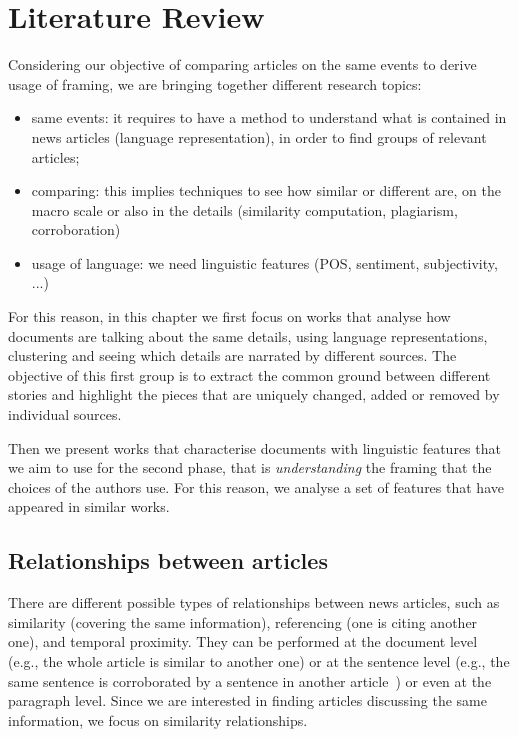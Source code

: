 \chapter{Literature Review}
\label{chap:literature_review}


Considering our objective of comparing articles on the same events to derive  usage of framing, we are bringing together different research topics:

\begin{itemize}
    \item same events: it requires to have a method to understand what is contained in news articles (language representation), in order to find groups of relevant articles;
    \item comparing: this implies techniques to see how similar or different are, on the macro scale or also in the details (similarity computation, plagiarism, corroboration)
    \item usage of language: we need linguistic features (POS, sentiment, subjectivity, ...)
\end{itemize}

For this reason, in this chapter we first focus on works that analyse how documents are talking about the same details, using language representations, clustering and seeing which details are narrated by different sources.
The objective of this first group is to extract the common ground between different stories and highlight the pieces that are uniquely changed, added or removed by individual sources.

Then we present works that characterise documents with linguistic features that we aim to use for the second phase, that is \emph{understanding} the framing that the choices of the authors use. For this reason, we analyse a set of features that have appeared in similar works.


\section{Relationships between articles}

There are different possible types of relationships between news articles, such as similarity (covering the same information), referencing (one is citing another one), and temporal proximity. They can be performed at the document level (e.g., the whole article is similar to another one) or at the sentence level (e.g., the same sentence is corroborated by a sentence in another article~\cite{bountouridis2018explaining}) or even at the paragraph level.
Since we are interested in finding articles discussing the same information, we focus on similarity relationships.

